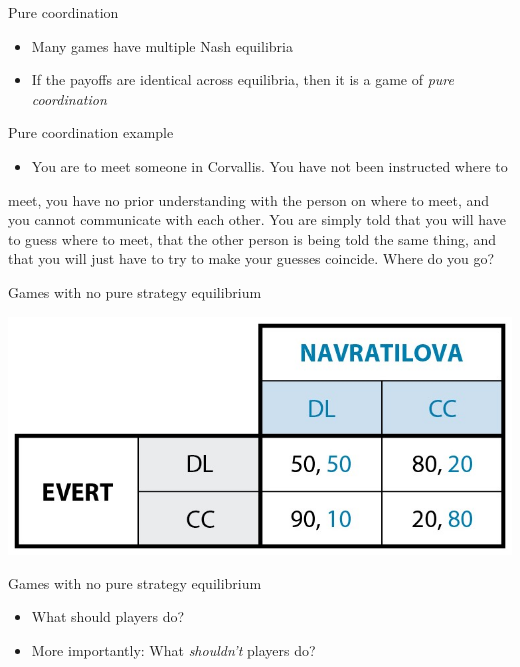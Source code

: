 \documentclass[10pt]{beamer}
\begin{document}
\begin{frame}[label={sec:orgc8f0320}]{}
\alert{Pure coordination} 
\begin{itemize}
\item Many games have multiple Nash equilibria
\item If the payoffs are identical across equilibria, then it is a game of \emph{pure coordination}
\end{itemize}
\end{frame}

\begin{frame}[label={sec:org1252543}]{}
\alert{Pure coordination example}
\begin{itemize}
\item You are to meet someone in Corvallis. You have not been instructed where to
\end{itemize}
meet, you have no prior understanding with the person on where to meet, and
you cannot communicate with each other. You are simply told that you will
have to guess where to meet, that the other person is being told the same
thing, and that you will just have to try to make your guesses coincide. Where
do you go?
\end{frame}

\begin{frame}[label={sec:orgb33307b}]{Games with no pure strategy equilibrium}
\begin{center}
\includegraphics[width=.75\textwidth]{./img/GAMES4_FIG04.14.jpg}
\end{center}
\end{frame}

\begin{frame}[label={sec:org95a96c1}]{}
\alert{Games with no pure strategy equilibrium}
\begin{itemize}
\item What should players do?
\item More importantly: What \emph{shouldn't} players do?
\end{itemize}
\end{frame}
\end{document}
